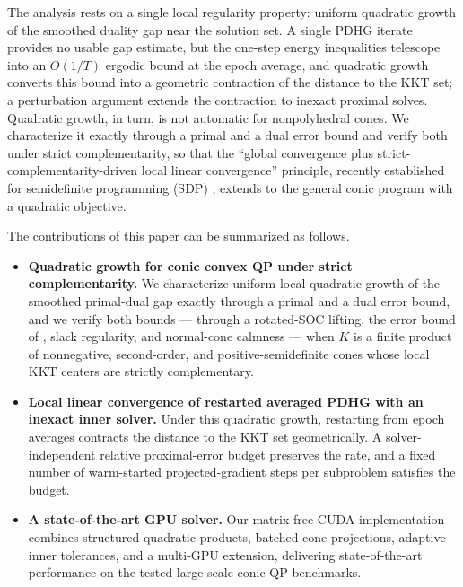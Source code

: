 \documentclass[letterpaper]{article} %
\theoremstyle{definition}
\theoremstyle{remark}
\begin{document}
The analysis rests on a single local regularity property: uniform
quadratic growth of the smoothed duality gap near the solution set.  A
single PDHG iterate provides no usable gap estimate, but the one-step
energy inequalities telescope into an $O(1/T)$ ergodic bound at the epoch
average, and quadratic growth converts this bound into a geometric
contraction of the distance to the KKT set; a perturbation argument
extends the contraction to inexact proximal solves.  Quadratic growth, in
turn, is not automatic for nonpolyhedral cones.  We characterize it
exactly through a primal and a dual error bound and verify both under
strict complementarity, so that the ``global convergence plus
strict-complementarity-driven local linear convergence'' principle,
recently established for semidefinite programming (SDP)
\cite{jiang2026pdhgsdp,kang2025admmsdp},
extends to the general conic program with a quadratic objective.

The contributions of this paper can be summarized as follows.
\begin{itemize}
    \item \textbf{Quadratic growth for conic convex QP under strict
    complementarity.}
    We characterize uniform local quadratic growth of the smoothed
    primal-dual gap exactly through a primal and a dual error bound, and
    we verify both bounds --- through a rotated-SOC lifting, the error
    bound of \cite{ding2023strict}, slack regularity, and normal-cone
    calmness --- when $K$ is a finite product of nonnegative, second-order,
    and positive-semidefinite cones whose local KKT centers are strictly
    complementary.

    \item \textbf{Local linear convergence of restarted averaged PDHG with
    an inexact inner solver.}
    Under this quadratic growth, restarting from epoch averages contracts
    the distance to the KKT set geometrically.  A solver-independent
    relative proximal-error budget preserves the rate, and a fixed number
    of warm-started projected-gradient steps per subproblem satisfies the
    budget.

    \item \textbf{A state-of-the-art GPU solver.}
    Our matrix-free CUDA implementation combines structured quadratic
    products, batched cone projections, adaptive inner tolerances, and a
    multi-GPU extension, delivering state-of-the-art performance on the
    tested large-scale conic QP benchmarks.
\end{itemize}
\end{document}
